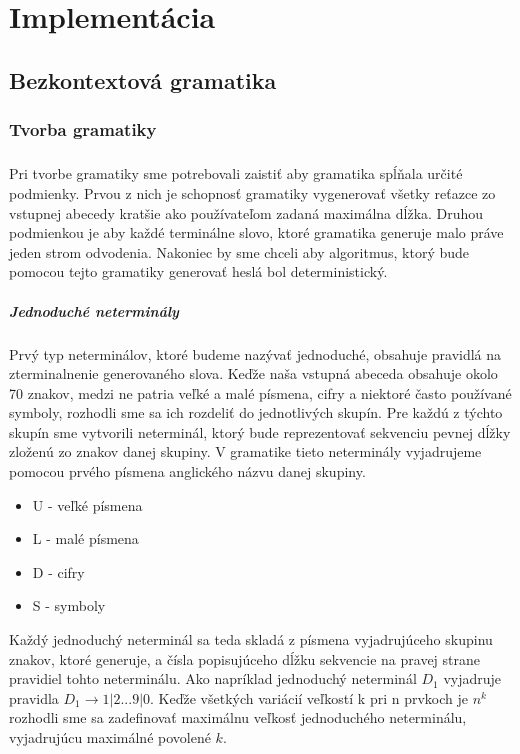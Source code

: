 \chapter{Implementácia}

\section{Bezkontextová gramatika}
\subsection{Tvorba gramatiky}
\paragraph{}
Pri tvorbe gramatiky sme potrebovali zaistiť aby gramatika spĺňala určité podmienky. Prvou z nich je schopnosť gramatiky vygenerovať všetky reťazce zo vstupnej abecedy kratšie ako používateľom zadaná maximálna dĺžka. Druhou podmienkou je aby každé terminálne slovo, ktoré gramatika generuje malo práve jeden strom odvodenia. Nakoniec by sme chceli aby algoritmus, ktorý bude pomocou tejto gramatiky generovať heslá bol deterministický.

\paragraph{Jednoduché neterminály}
Prvý typ neterminálov, ktoré budeme nazývať jednoduché, obsahuje pravidlá na zterminalnenie generovaného slova. Keďže naša vstupná abeceda obsahuje okolo 70 znakov, medzi ne patria veľké a malé písmena, cifry a niektoré často používané symboly, rozhodli sme sa ich rozdeliť do jednotlivých skupín. Pre každú z týchto skupín sme vytvorili neterminál, ktorý bude reprezentovať sekvenciu pevnej dĺžky zloženú zo znakov danej skupiny. V gramatike tieto neterminály vyjadrujeme pomocou prvého písmena anglického názvu danej skupiny.
\begin{itemize}
	\item U - veľké písmena
	\item L - malé písmena
	\item D - cifry
	\item S - symboly
\end{itemize}
Každý jednoduchý neterminál sa teda skladá z písmena vyjadrujúceho skupinu znakov, ktoré generuje, a čísla popisujúceho dĺžku sekvencie na pravej strane pravidiel tohto neterminálu. Ako napríklad jednoduchý neterminál \(D_1\) vyjadruje pravidla \(D_1 \to 1 | 2 ... 9 | 0 \). Keďže všetkých variácií veľkostí k pri n prvkoch je \( n^k\) rozhodli sme sa zadefinovať maximálnu veľkosť jednoduchého neterminálu, vyjadrujúcu maximálné povolené \(k\).

